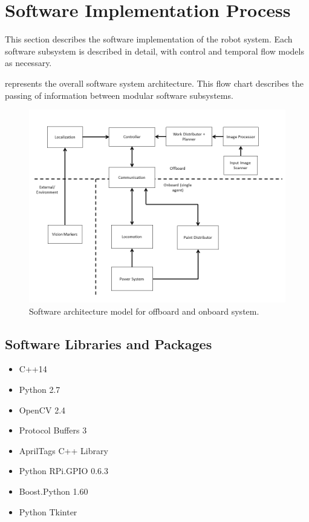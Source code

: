 
\section{Software Implementation Process}
\label{sec:software_implementation}
This section describes the software implementation of the robot system. Each software subsystem is described in detail, with control and temporal flow models as necessary.

 represents the overall software system architecture. This flow chart describes the passing of information between modular software subsystems.

\begin{figure}
\centering
\includegraphics[width=0.9\columnwidth]{figs/systems_diagram.png}
\caption{Software architecture model for offboard and onboard system.}
\label{fig:software_design_arch}
\end{figure}

\subsection{Software Libraries and Packages}
\label{sec:software_libraries}
\begin{itemize}
  \item C++14
  \item Python 2.7 \cite{python27}
  \item OpenCV 2.4 \cite{opencv24}
  \item Protocol Buffers 3 \cite{protobuf3}
  \item AprilTags C++ Library \cite{apriltags}
  \item Python RPi.GPIO 0.6.3 \cite{python_rpigpio}
  \item Boost.Python 1.60 \cite{python_boost}
  \item Python Tkinter \cite{python_tkinter}
\end{itemize}









